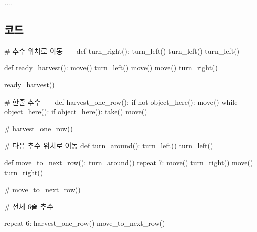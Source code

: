 \documentclass[
  b5paperpaper,
  DIV=11,
  numbers=noendperiod]{scrreprt}
\newenvironment{Shaded}{\begin{snugshade}}{\end{snugshade}}
\newcommand{\CommentTok}[1]{\textcolor[rgb]{0.37,0.37,0.37}{#1}}
\newcommand{\ControlFlowTok}[1]{\textcolor[rgb]{0.00,0.23,0.31}{#1}}
\newcommand{\DecValTok}[1]{\textcolor[rgb]{0.68,0.00,0.00}{#1}}
\newcommand{\FunctionTok}[1]{\textcolor[rgb]{0.28,0.35,0.67}{#1}}
\newcommand{\NormalTok}[1]{\textcolor[rgb]{0.00,0.23,0.31}{#1}}
\newcommand{\SpecialCharTok}[1]{\textcolor[rgb]{0.37,0.37,0.37}{#1}}
\begin{document}
\url{....}

\hypertarget{uxcf54uxb4dc-25}{%
\subsection{코드}\label{uxcf54uxb4dc-25}}

\begin{Shaded}
\begin{Highlighting}[]
\CommentTok{\# 추수 위치로 이동 {-}{-}{-}{-}}
\NormalTok{def }\FunctionTok{turn\_right}\NormalTok{()}\SpecialCharTok{:}
    \FunctionTok{turn\_left}\NormalTok{()}
    \FunctionTok{turn\_left}\NormalTok{()}
    \FunctionTok{turn\_left}\NormalTok{()}
    
\NormalTok{def }\FunctionTok{ready\_harvest}\NormalTok{()}\SpecialCharTok{:}
    \FunctionTok{move}\NormalTok{()}
    \FunctionTok{turn\_left}\NormalTok{()}
    \FunctionTok{move}\NormalTok{()}
    \FunctionTok{move}\NormalTok{()}
    \FunctionTok{turn\_right}\NormalTok{()}
  
\FunctionTok{ready\_harvest}\NormalTok{()}

\CommentTok{\# 한줄 추수 {-}{-}{-}{-}}
\NormalTok{def }\FunctionTok{harvest\_one\_row}\NormalTok{()}\SpecialCharTok{:}
    \ControlFlowTok{if}\NormalTok{ not }\FunctionTok{object\_here}\NormalTok{()}\SpecialCharTok{:}
        \FunctionTok{move}\NormalTok{()}
    \ControlFlowTok{while} \FunctionTok{object\_here}\NormalTok{()}\SpecialCharTok{:}
        \ControlFlowTok{if} \FunctionTok{object\_here}\NormalTok{()}\SpecialCharTok{:}
            \FunctionTok{take}\NormalTok{()}
        \FunctionTok{move}\NormalTok{()}
          
\CommentTok{\# harvest\_one\_row()}

\CommentTok{\# 다음 추수 위치로 이동}
\NormalTok{def }\FunctionTok{turn\_around}\NormalTok{()}\SpecialCharTok{:}
    \FunctionTok{turn\_left}\NormalTok{()}
    \FunctionTok{turn\_left}\NormalTok{()}

\NormalTok{def }\FunctionTok{move\_to\_next\_row}\NormalTok{()}\SpecialCharTok{:}    
    \FunctionTok{turn\_around}\NormalTok{()}
    \ControlFlowTok{repeat} \DecValTok{7}\SpecialCharTok{:}
        \FunctionTok{move}\NormalTok{()}
    \FunctionTok{turn\_right}\NormalTok{()}
    \FunctionTok{move}\NormalTok{()}
    \FunctionTok{turn\_right}\NormalTok{()}
    
\CommentTok{\# move\_to\_next\_row()}

\CommentTok{\# 전체 6줄 추수}

\ControlFlowTok{repeat} \DecValTok{6}\SpecialCharTok{:}
    \FunctionTok{harvest\_one\_row}\NormalTok{()}
    \FunctionTok{move\_to\_next\_row}\NormalTok{()}
\end{Highlighting}
\end{Shaded}
\end{document}

